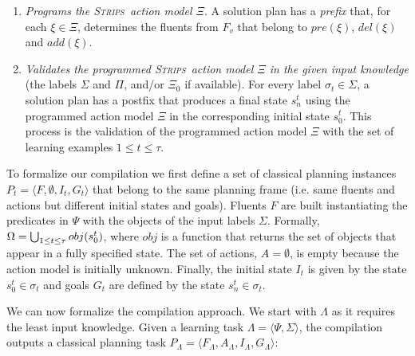 \documentclass[letterpaper]{article} %
\newcommand{\tup}[1]{{\langle #1 \rangle}}
\newcommand{\strips}{\textsc{Strips}}     %
\begin{document}
\begin{enumerate}
\item {\em Programs the \strips\ action model $\Xi$}. A solution plan has a {\em prefix} that, for each $\xi\in\Xi$, determines the fluents from $F_v$ that belong to $pre(\xi)$, $del(\xi)$ and $add(\xi)$.
\item {\em Validates the programmed \strips\ action model $\Xi$ in the given input knowledge} (the labels $\Sigma$ and $\Pi$, and/or $\Xi_0$ if available). For every label $\sigma_t\in \Sigma$, a solution plan has a postfix that produces a final state $s_{n}^t$ using the programmed action model $\Xi$ in the corresponding initial state $s_0^t$. This process is the validation of the programmed action model $\Xi$ with the set of learning examples {\small $1\leq t\leq \tau$}. %
\end{enumerate}

To formalize our compilation we first define a set of classical planning instances $P_t=\tup{F,\emptyset,I_t,G_t}$ that belong to the same planning frame (i.e. same fluents and actions but different initial states and goals). Fluents $F$ are built instantiating the predicates in $\Psi$ with the objects of the input labels $\Sigma$. Formally, $\Omega=\bigcup_{\small 1\leq t\leq \tau} obj(s_0^t)$, where $obj$ is a function that returns the set of objects that appear in a fully specified state. The set of actions, $A=\emptyset$, is empty because the action model is initially unknown. Finally, the initial state $I_t$ is given by the state $s_0^t\in \sigma_t$ and goals $G_t$ are defined by the state $s_n^t\in \sigma_t$.

We can now formalize the compilation approach. We start with $\Lambda$ as it requires the least input knowledge. Given a learning task $\Lambda=\tup{\Psi,\Sigma}$, the compilation outputs a classical planning task $P_{\Lambda}=\tup{F_{\Lambda},A_{\Lambda},I_{\Lambda},G_{\Lambda}}$:
\end{document}
